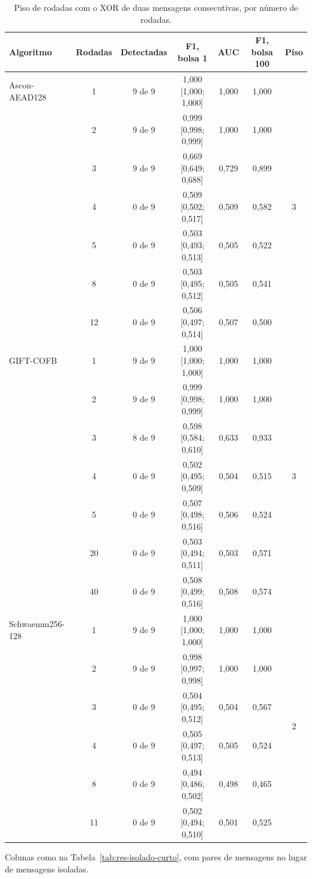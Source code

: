 \begin{table}[htb]
\centering
\caption{Piso de rodadas com o XOR de duas mensagens consecutivas, por número de rodadas.}
\label{tab:res-piso}
\footnotesize
\setlength{\tabcolsep}{4pt}
\begin{tabular}{lcccccc}
\toprule
Algoritmo & Rodadas & Detectadas & F1, bolsa 1 & AUC & F1, bolsa 100 & Piso \\
\midrule
Ascon-AEAD128   & 1  & 9 de 9 & 1,000 [1,000; 1,000] & 1,000 & 1,000 & \multirow{7}{*}{3} \\
                & 2  & 9 de 9 & 0,999 [0,998; 0,999] & 1,000 & 1,000 & \\
                & 3  & 9 de 9 & 0,669 [0,649; 0,688] & 0,729 & 0,899 & \\
                & 4  & 0 de 9 & 0,509 [0,502; 0,517] & 0,509 & 0,582 & \\
                & 5  & 0 de 9 & 0,503 [0,493; 0,513] & 0,505 & 0,522 & \\
                & 8  & 0 de 9 & 0,503 [0,495; 0,512] & 0,505 & 0,541 & \\
                & 12 & 0 de 9 & 0,506 [0,497; 0,514] & 0,507 & 0,500 & \\
\midrule
GIFT-COFB       & 1  & 9 de 9 & 1,000 [1,000; 1,000] & 1,000 & 1,000 & \multirow{7}{*}{3} \\
                & 2  & 9 de 9 & 0,999 [0,998; 0,999] & 1,000 & 1,000 & \\
                & 3  & 8 de 9 & 0,598 [0,584; 0,610] & 0,633 & 0,933 & \\
                & 4  & 0 de 9 & 0,502 [0,495; 0,509] & 0,504 & 0,515 & \\
                & 5  & 0 de 9 & 0,507 [0,498; 0,516] & 0,506 & 0,524 & \\
                & 20 & 0 de 9 & 0,503 [0,494; 0,511] & 0,503 & 0,571 & \\
                & 40 & 0 de 9 & 0,508 [0,499; 0,516] & 0,508 & 0,574 & \\
\midrule
Schwaemm256-128 & 1  & 9 de 9 & 1,000 [1,000; 1,000] & 1,000 & 1,000 & \multirow{6}{*}{2} \\
                & 2  & 9 de 9 & 0,998 [0,997; 0,998] & 1,000 & 1,000 & \\
                & 3  & 0 de 9 & 0,504 [0,495; 0,512] & 0,504 & 0,567 & \\
                & 4  & 0 de 9 & 0,505 [0,497; 0,513] & 0,505 & 0,524 & \\
                & 8  & 0 de 9 & 0,494 [0,486; 0,502] & 0,498 & 0,465 & \\
                & 11 & 0 de 9 & 0,502 [0,494; 0,510] & 0,501 & 0,525 & \\
\bottomrule
\end{tabular}
\par\smallskip\footnotesize Colunas como na Tabela~\ref{tab:res-isolado-curto}, com pares de mensagens no lugar de mensagens isoladas.
 
\end{table}

